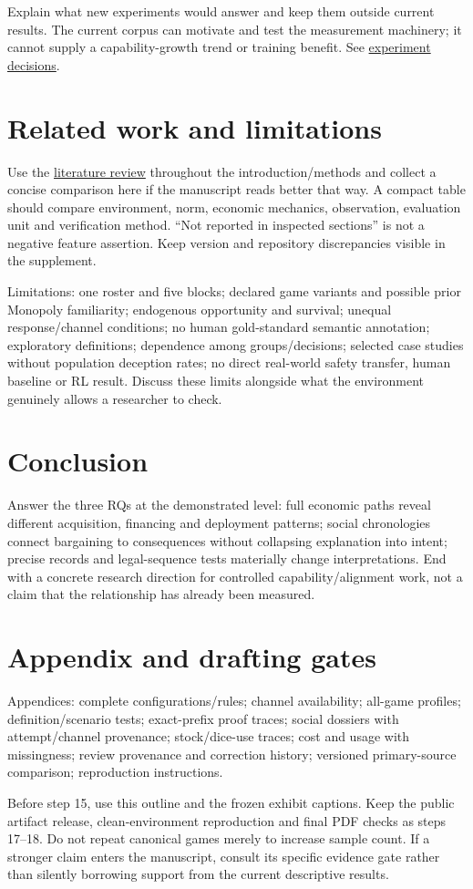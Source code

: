 Explain what new experiments would answer and keep them outside current results. The current corpus can motivate and test the measurement machinery; it cannot supply a capability-growth trend or training benefit. See \href{run:../experiment_decisions.md}{experiment decisions}.

\section{Related work and limitations}
Use the \href{run:../literature_review.md}{literature review} throughout the introduction/methods and collect a concise comparison here if the manuscript reads better that way. A compact table should compare environment, norm, economic mechanics, observation, evaluation unit and verification method. ``Not reported in inspected sections'' is not a negative feature assertion. Keep version and repository discrepancies visible in the supplement.

Limitations: one roster and five blocks; declared game variants and possible prior Monopoly familiarity; endogenous opportunity and survival; unequal response/channel conditions; no human gold-standard semantic annotation; exploratory definitions; dependence among groups/decisions; selected case studies without population deception rates; no direct real-world safety transfer, human baseline or RL result. Discuss these limits alongside what the environment genuinely allows a researcher to check.

\section{Conclusion}
Answer the three RQs at the demonstrated level: full economic paths reveal different acquisition, financing and deployment patterns; social chronologies connect bargaining to consequences without collapsing explanation into intent; precise records and legal-sequence tests materially change interpretations. End with a concrete research direction for controlled capability/alignment work, not a claim that the relationship has already been measured.

\section*{Appendix and drafting gates}
Appendices: complete configurations/rules; channel availability; all-game profiles; definition/scenario tests; exact-prefix proof traces; social dossiers with attempt/channel provenance; stock/dice-use traces; cost and usage with missingness; review provenance and correction history; versioned primary-source comparison; reproduction instructions.

Before step 15, use this outline and the frozen exhibit captions. Keep the public artifact release, clean-environment reproduction and final PDF checks as steps 17--18. Do not repeat canonical games merely to increase sample count. If a stronger claim enters the manuscript, consult its specific evidence gate rather than silently borrowing support from the current descriptive results.

